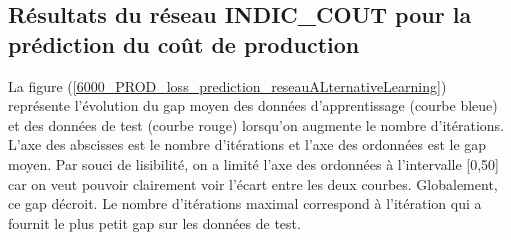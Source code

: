 %
%
%
%
\subsection{Résultats du réseau \textbf{INDIC\_COUT} pour la prédiction du coût de production}

La figure (\ref{6000_PROD_loss_prediction_reseauALternativeLearning}) représente l'évolution du gap moyen des données d'apprentissage (courbe bleue) et des données de test (courbe rouge) lorsqu'on augmente le nombre d'itérations. L'axe des abscisses est le nombre d'itérations et l'axe des ordonnées est le gap moyen. Par souci de lisibilité, on a limité l'axe des ordonnées à l'intervalle [0,50] car on veut pouvoir clairement voir l'écart entre les deux courbes. Globalement, ce gap décroit. %
Le nombre d'itérations maximal correspond à l'itération qui a fournit le plus petit gap sur les données de test.

